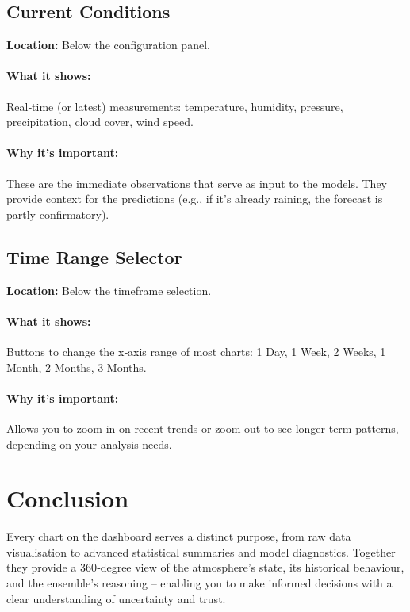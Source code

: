 \documentclass[11pt,a4paper]{article}
\begin{document}
	\subsection{Current Conditions}
	\textbf{Location:} Below the configuration panel.
	
	\paragraph{What it shows:}
	Real‑time (or latest) measurements: temperature, humidity, pressure, precipitation, cloud cover, wind speed.
	
	\paragraph{Why it’s important:}
	These are the immediate observations that serve as input to the models. They provide context for the predictions (e.g., if it’s already raining, the forecast is partly confirmatory).
	
	\subsection{Time Range Selector}
	\textbf{Location:} Below the timeframe selection.
	
	\paragraph{What it shows:}
	Buttons to change the x‑axis range of most charts: 1 Day, 1 Week, 2 Weeks, 1 Month, 2 Months, 3 Months.
	
	\paragraph{Why it’s important:}
	Allows you to zoom in on recent trends or zoom out to see longer‑term patterns, depending on your analysis needs.
	
	\section{Conclusion}
	Every chart on the dashboard serves a distinct purpose, from raw data visualisation to advanced statistical summaries and model diagnostics. Together they provide a 360‑degree view of the atmosphere’s state, its historical behaviour, and the ensemble’s reasoning – enabling you to make informed decisions with a clear understanding of uncertainty and trust.
	
\end{document}
